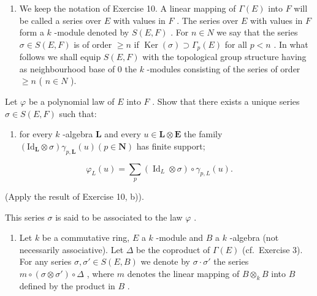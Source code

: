 \begin{enumerate}
\def\labelenumi{\arabic{enumi})}
\setcounter{enumi}{10}
\tightlist
\item
  We keep the notation of Exercise 10. A linear mapping of \(\Gamma(E)\) into \(F\) will be called a series over \(E\) with values in \(F\) . The series over \(E\) with values in \(F\) form a \(k\) -module denoted by \(S(E, F)\) . For \(n \in N\) we say that the series \(\sigma \in S(E, F)\) is of order \(\geqslant n\) if \(\operatorname{Ker}(\sigma) \supset \Gamma_p(E)\) for all \(p < n\) . In what follows we shall equip \(S(E, F)\) with the topological group structure having as neighbourhood base of 0 the \(k\) -modules consisting of the series of order \(\geqslant n\) ( \(n \in N\) ).
\end{enumerate}

Let \(\varphi\) be a polynomial law of \(E\) into \(F\) . Show that there exists a unique series \(\sigma \in S(E, F)\) such that:

\begin{enumerate}
\def\labelenumi{(\roman{enumi})}
\tightlist
\item
  for every \(k\) -algebra \(\mathbf{L}\) and every \(u \in \mathbf{L} \otimes \mathbf{E}\) the family \((\mathrm{Id}_{\mathbf{L}} \otimes \sigma) \gamma_{p,\mathbf{L}}(u) (p \in \mathbf{N})\) has finite support;
\end{enumerate}

\[
\varphi_ {L} (u) = \sum_ {p} \left(\operatorname{Id} _ {L} \otimes \sigma\right) \circ \gamma_ {p, L} (u). \tag {ii}
\]

(Apply the result of Exercise 10, b)).

This series \(\sigma\) is said to be associated to the law \(\varphi\) .

\begin{enumerate}
\def\labelenumi{\arabic{enumi})}
\setcounter{enumi}{11}
\tightlist
\item
  Let \(k\) be a commutative ring, \(E\) a \(k\) -module and \(B\) a \(k\) -algebra (not necessarily associative). Let \(\Delta\) be the coproduct of \(\Gamma(E)\) (cf.~Exercise 3). For any series \(\sigma, \sigma' \in S(E, B)\) we denote by \(\sigma \cdot \sigma'\) the series \(m \circ (\sigma \otimes \sigma') \circ \Delta\) , where \(m\) denotes the linear mapping of \(B \otimes_k B\) into \(B\) defined by the product in \(B\) .
\end{enumerate}

